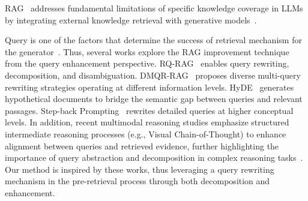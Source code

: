 
RAG~\citep{lewis2020retrieval, gao2023retrieval} addresses fundamental limitations of specific knowledge coverage in LLMs by integrating external knowledge retrieval with generative models~\citep{wang2023augmenting}.



Query is one of the factors that determine the success of retrieval mechanism for the generator~\cite{wang2024evaluating}.
Thus, several works explore the RAG improvement technique from the query enhancement perspective.
RQ-RAG~\citep{chan2024rq} enables query rewriting, decomposition, and disambiguation. 
DMQR-RAG~\citep{li2024dmqr} proposes diverse multi-query rewriting strategies operating at different information levels. 
HyDE~\citep{gao2022precise}  generates hypothetical documents to bridge the semantic gap between queries and relevant passages. 
Step-back Prompting~\citep{zheng2023take} rewrites detailed queries at higher conceptual levels. 
In addition, recent multimodal reasoning studies emphasize structured intermediate reasoning processes (e.g., Visual Chain-of-Thought) to enhance alignment between queries and retrieved evidence, further highlighting the importance of query abstraction and decomposition in complex reasoning tasks~\citep{zheng2026towards}.
Our method is inspired by these works, thus leveraging a query rewriting mechanism in the pre-retrieval process through both decomposition and enhancement.


